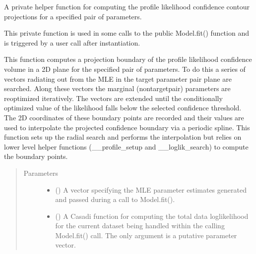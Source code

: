 \documentclass[letterpaper,10pt,english,openany,oneside]{sphinxmanual}
\begin{document}
\begin{fulllineitems}
\begin{fulllineitems}
\label{\detokenize{nloed:nloed.model.Model.__contour_trace}}
A private helper function for computing the profile likelihood confidence contour
projections for a specified pair of parameters.

This private function is used in some calls to the public Model.fit() function and is
triggered by a user call after instantiation.

This function computes a projection boundary of the profile likelihood confidence volume in
a 2D plane for the specified pair of parameters. To do this a series of vectors radiating
out from the MLE in the target parameter pair plane are searched. Along these vectors the
marginal (non\sphinxhyphen{}target\sphinxhyphen{}pair) parameters are re\sphinxhyphen{}optimized iteratively. The vectors are extended
until the conditionally optimized value of the likelihood falls below the selected confidence
threshold. The 2D coordinates of these boundary points are recorded and their values are used
to interpolate the projected confidence boundary via a periodic spline. This function
sets up the radial search and performs the interpolation but relies on lower level helper
functions (\_\_profile\_setup and \_\_loglik\_search) to compute the boundary points.
\begin{quote}\begin{description}
\item[{Parameters}] \leavevmode\begin{itemize}
\item {} 
 (\sphinxstyleliteralemphasis{\sphinxupquote{, }}) \textendash{} A vector specifying the MLE parameter estimates generated and
passed during a call to Model.fit().

\item {} 
 () \textendash{} A Casadi function for computing the total data log\sphinxhyphen{}likelihood
for the current dataset being handled within the calling Model.fit() call. The only
argument is a putative parameter vector.


\end{itemize}
\end{description}
\end{quote}
\end{fulllineitems}
\end{fulllineitems}
\end{document}
